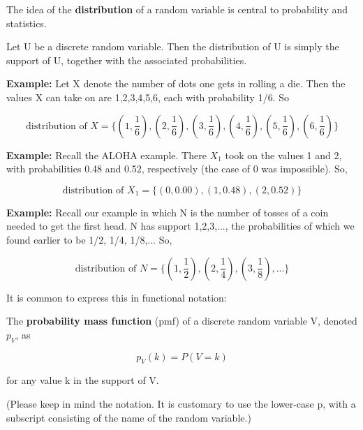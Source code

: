 The idea of the {\bf distribution} of a random variable is central to
probability and statistics.

\begin{definition}
Let U be a discrete random variable.  Then the distribution of U is 
simply the support of U, together with  the associated probabilities. 
\end{definition}

{\bf Example:}  Let X denote the number of dots one gets in rolling a
die.  Then the values X can take on are 1,2,3,4,5,6, each with
probability 1/6.  So

\begin{equation}
\textrm{distribution of } X =
\{
(1,\frac{1}{6}),
(2,\frac{1}{6}),
(3,\frac{1}{6}),
(4,\frac{1}{6}),
(5,\frac{1}{6}),
(6,\frac{1}{6})
\}
\end{equation}

{\bf Example:}  Recall the ALOHA example. There $X_1$ took on the values
1 and 2, with probabilities 0.48 and 0.52, respectively (the case of 0
was impossible).  So, 

\begin{equation}
\textrm{distribution of } X_1 =
\{
(0,0.00),
(1,0.48),
(2,0.52)
\}
\end{equation}

{\bf Example:}  Recall our example in which N is the number of tosses of a
coin needed to get the first head.  N has support 1,2,3,..., the 
probabilities of which we found earlier to be 1/2, 1/4, 1/8,...  So, 

\begin{equation}
\textrm{distribution of } N =
\label{geomdie}
\{
(1,\frac{1}{2}),
(2,\frac{1}{4}),
(3,\frac{1}{8}),
...
\}
\end{equation}

It is common to express this in functional notation:  

\begin{definition}
The {\bf probability mass function} (pmf) of a 
discrete random variable V, denoted $p_V$, as

\begin{equation}
p_V(k) = P(V = k)
\end{equation}

for any value k in the support of V.
\end{definition}

(Please keep in mind the notation.  It is customary to use the
lower-case p, with a subscript consisting of the name of the random
variable.)

